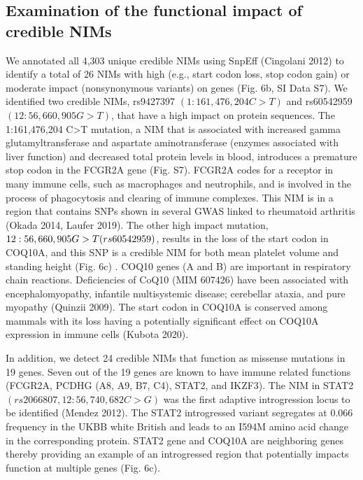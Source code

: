 \subsection{Examination of the functional impact of credible NIMs}
We annotated all 4,303 unique credible NIMs using SnpEff (Cingolani 2012) to identify a total of 26 NIMs with high (e.g., start codon loss, stop codon gain) or moderate impact (nonsynonymous variants) on genes (Fig. 6b, SI Data S7). We identified two credible NIMs, rs9427397 $(1:161,476,204 C>T)$ and rs60542959 $(12:56,660,905 G>T)$, that have a high impact on protein sequences. The 1:161,476,204 C>T mutation, a NIM that is associated with increased gamma glutamyltransferase and aspartate aminotransferase (enzymes associated with liver function) and decreased total protein levels in blood, introduces a premature stop codon in the FCGR2A gene (Fig. S7). FCGR2A codes for a receptor in many immune cells, such as macrophages and neutrophils, and is involved in the process of phagocytosis and clearing of immune complexes. This NIM is in a region that contains SNPs shown in several GWAS  linked to rheumatoid arthritis (Okada 2014, Laufer 2019). The other high impact mutation, $12:56,660,905\\ G>T (rs60542959)$, results in the loss of the start codon in COQ10A, and this SNP is a credible NIM for both mean platelet volume and standing height (Fig. 6c) . COQ10 genes (A and B) are important in respiratory chain reactions. Deficiencies of CoQ10 (MIM 607426) have been associated with encephalomyopathy, infantile multisystemic disease; cerebellar ataxia, and pure myopathy (Quinzii 2009). The start codon in COQ10A is conserved among mammals with its loss having a potentially significant effect on COQ10A expression in immune cells (Kubota 2020).

In addition, we detect 24 credible NIMs that function as missense mutations in 19 genes. Seven out of the 19 genes are known to have immune related functions (FCGR2A, PCDHG (A8, A9, B7, C4), STAT2, and IKZF3).  The NIM in STAT2 $(rs2066807, 12:56,740,682 C>G)$ was the first adaptive introgression locus to be identified (Mendez 2012). The STAT2 introgressed variant segregates at 0.066 frequency in the UKBB white British and leads to an I594M amino acid change in the corresponding protein. STAT2 gene and COQ10A are neighboring genes thereby providing an example of an introgressed region that potentially impacts function at multiple genes (Fig. 6c). 

